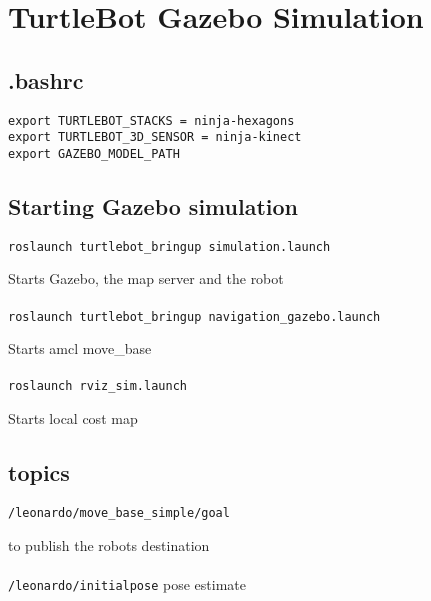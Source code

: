 \chapter{TurtleBot Gazebo Simulation}
\label{chap:TurtleBotGazeboSimulation}

	
\section{.bashrc}
	\texttt{export TURTLEBOT\_STACKS = ninja-hexagons}
	\\
	\texttt{export TURTLEBOT\_3D\_SENSOR = ninja-kinect}
	\\
	\texttt{export GAZEBO\_MODEL\_PATH}


\section{Starting Gazebo simulation}

\texttt{roslaunch turtlebot\_bringup simulation.launch}
	
	Starts Gazebo, the map server and the robot	
	\\	
	\\	
		
\texttt{roslaunch turtlebot\_bringup navigation\_gazebo.launch}
	
	Starts amcl move\_base
	\\
	\\
	
\texttt{roslaunch rviz\_sim.launch}
	
	Starts local cost map

\section{topics}

\texttt{/leonardo/move\_base\_simple/goal}

	to publish the robots destination
\\
\\
\texttt{/leonardo/initialpose}
	pose estimate	
